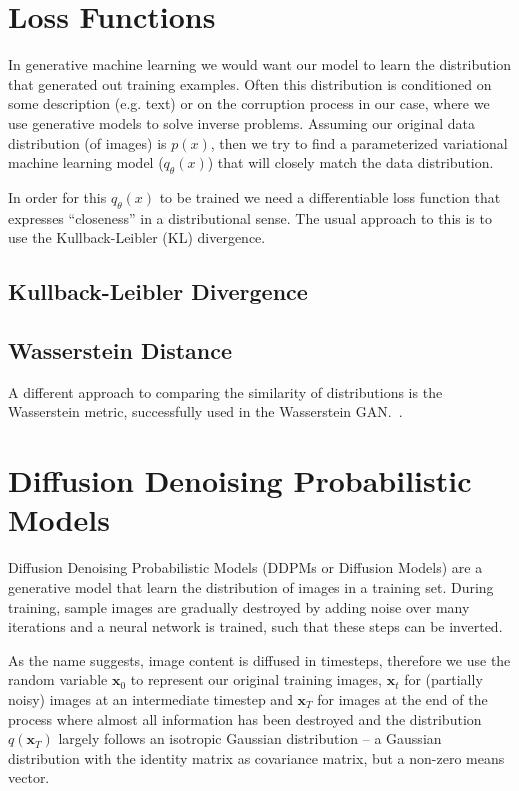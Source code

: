 \section{Loss Functions}
In generative machine learning we would want our model to learn the distribution that generated
out training examples. Often this distribution is conditioned on some description (e.g. text) or
on the corruption process in our case, where we use generative models to solve inverse problems.
Assuming our original data distribution (of images) is $p(x)$, then we try to find a parameterized
variational machine learning model ($q_{\theta}(x)$) that will closely match the data distribution.

In order for this $q_{\theta}(x)$ to be trained we need a differentiable loss function that expresses
\enquote{closeness} in a distributional sense. The usual approach to this is to use the Kullback-Leibler (KL)
divergence.

\subsection{Kullback-Leibler Divergence}

\subsection{Wasserstein Distance}
A different approach to comparing the similarity of distributions is the Wasserstein metric, successfully used in the Wasserstein GAN.~\autocite{arjovsky2017wasserstein}.

\section{Diffusion Denoising Probabilistic Models}
Diffusion Denoising Probabilistic Models (DDPMs or Diffusion Models) are a generative model that learn the distribution of images in a training set. During training, sample images are gradually destroyed by adding noise over many iterations and a neural network is trained, such that these steps can be inverted.

As the name suggests, image content is diffused in timesteps, therefore we use the random variable $\bm{x}_0$ to represent our original training images, $\bm{x}_t$ for (partially noisy) images at an intermediate timestep and $\bm{x}_T$ for images at the end of the process where almost all information has been destroyed and the distribution $q(\bm{x}_T)$ largely follows an isotropic Gaussian distribution -- a Gaussian distribution with the identity matrix as covariance matrix, but a non-zero means vector.

